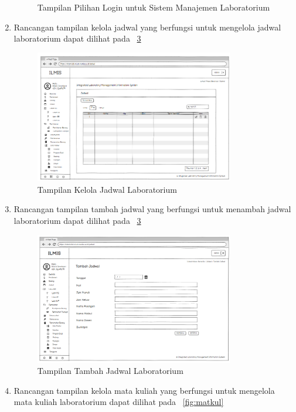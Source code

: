 \begin{enumerate}
\begin{figure}
		      \caption{Tampilan Pilihan Login untuk Sistem Manajemen Laboratorium}
		      \label{fig:kelola-jadwal-2}
	      \end{figure}
	\item Rancangan tampilan kelola jadwal yang berfungsi untuk mengelola jadwal laboratorium dapat dilihat pada \pic~\ref{fig:jadwal}
	      \begin{figure}
		      \centering
		      \includegraphics[width=0.82\textwidth]{konten/gambar/user interface/ui-jadwal.png}
		      \caption{Tampilan Kelola Jadwal Laboratorium}
		      \label{fig:jadwal}
	      \end{figure}
	\item Rancangan tampilan tambah jadwal yang berfungsi untuk menambah jadwal laboratorium dapat dilihat pada \pic~\ref{fig:jadwal}
	      \begin{figure}
		      \centering
		      \includegraphics[width=0.82\textwidth]{konten/gambar/tambah-jadwal.png}
		      \caption{Tampilan Tambah Jadwal Laboratorium}
		      \label{fig:jadwal}
	      \end{figure}
	\item Rancangan tampilan kelola mata kuliah yang berfungsi untuk mengelola mata kuliah laboratorium dapat dilihat pada \pic~\ref{fig:matkul}

\end{enumerate}
